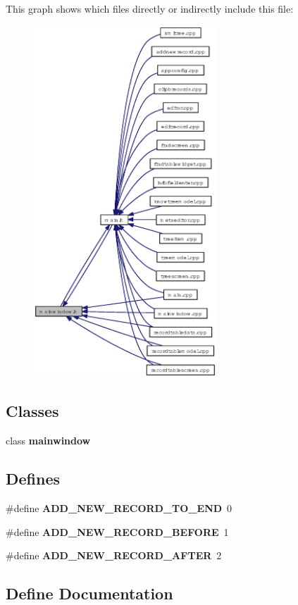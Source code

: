 This graph shows which files directly or indirectly include this file:\begin{figure}[H]
\begin{center}
\leavevmode
\includegraphics[width=194pt]{mainwindow_8h__dep__incl}
\end{center}
\end{figure}
\subsection*{Classes}
\begin{CompactItemize}
\item 
class {\bf mainwindow}
\end{CompactItemize}
\subsection*{Defines}
\begin{CompactItemize}
\item 
\#define {\bf ADD\_\-NEW\_\-RECORD\_\-TO\_\-END}~0
\item 
\#define {\bf ADD\_\-NEW\_\-RECORD\_\-BEFORE}~1
\item 
\#define {\bf ADD\_\-NEW\_\-RECORD\_\-AFTER}~2
\end{CompactItemize}


\subsection{Define Documentation}
